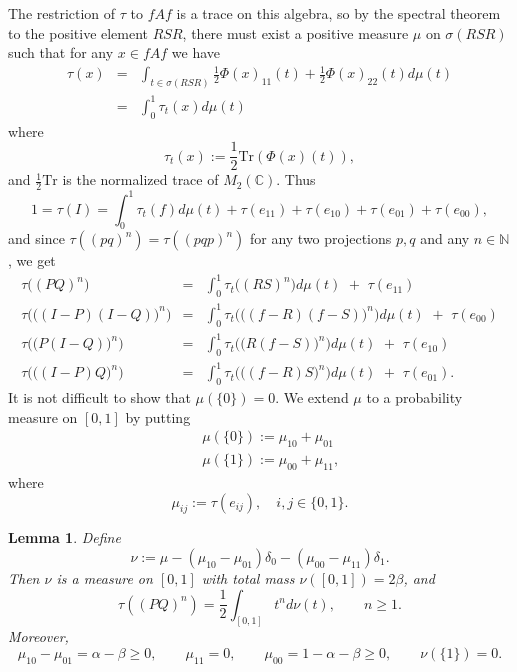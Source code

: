 \documentclass{amsart}
\newcommand{\C}{\mathbb C}
\newcommand{\N}{\mathbb N}
\newcommand{\Tr}{\mathrm{Tr}}
\newtheorem{lem}[thm]{Lemma}
\theoremstyle{definition}
\begin{document}
The restriction of $\tau$ to $f A f$ is a trace on this algebra, so by the spectral theorem to the positive element $RSR$, there must exist a positive measure $\mu$  on $\sigma(RSR)$ such that for any $x\in f Af$ we have
\begin{eqnarray*}
\tau(x)&=&\int_{t\in\sigma(RSR)} \frac12\Phi(x)_{11}(t) + \frac12\Phi(x)_{22}(t)d\mu(t)\\
&=&\int_0^1\tau_t(x)d\mu(t)
\end{eqnarray*}
where 
$$\tau_t(x):=\frac12\Tr(\Phi(x)(t)),$$
 and $\frac12\Tr$ is the normalized trace of $M_2(\C)$.
Thus  
 $$1=\tau(I)= \int_0^1\tau_t(f)d\mu(t)+\tau(e_{11})+\tau(e_{10})+\tau(e_{01})+\tau(e_{00}),$$ 
and since $\tau((pq)^n)=\tau((pqp)^n)$ for any two projections $p,q$ and any $n\in\N$, we get
\begin{eqnarray}\label{e:tauPQvna}
\tau\big((PQ)^n\big)&=&\int_0^1\tau_t\big((RS)^n\big)d\mu(t)\,\,+\,\, \tau(e_{11})\\
\nonumber\tau\Big(\big((I-P)(I-Q)\big)^n\Big)&=&\int_0^1\tau_t\Big(\big((f-R)(f-S)\big)^n\Big)d\mu(t)\,\,+\,\, \tau(e_{00})\\
\nonumber\tau\Big(\big(P(I-Q)\big)^n\Big)&=&\int_0^1\tau_t\Big(\big(R(f-S)\big)^n\Big)d\mu(t)\,\,+\,\, \tau(e_{10})\\
\nonumber\tau\Big(\big((I-P)Q\big)^n\Big)&=&\int_0^1\tau_t\Big(\big((f-R)S\big)^n\Big)d\mu(t)\,\,+\,\, \tau(e_{01}).
\nonumber\end{eqnarray}
It is not difficult to show that $\mu(\{0\})=0$.
We extend $\mu$ to a probability measure on $[0,1]$ by putting
\begin{eqnarray*}
&&\mu(\{0\}):=\mu_{10}+\mu_{01}\\
&&\mu(\{1\}):=\mu_{00}+\mu_{11},
\end{eqnarray*}
where
$$\mu_{ij}:=\tau(e_{ij}),\quad i,j\in\{0,1\}.$$
\begin{lem}\label{l:nu_mn}
Define $$\nu:=\mu-(\mu_{10}-\mu_{01})\delta_0-(\mu_{00}-\mu_{11})\delta_1.$$
Then $\nu$ is a measure on $[0,1]$ with total mass $\nu([0,1])=2\beta$, and
$$\tau((PQ)^n)=\frac12\int_{[0,1]}t^n d\nu(t), \qquad n\ge 1.$$
Moreover,
$$\mu_{10}-\mu_{01}=\alpha-\beta\ge0, \qquad\mu_{11}=0,\qquad \mu_{00}=1-\alpha-\beta\ge0, \qquad\nu(\{1\})=0.$$

\end{lem}
\end{document}
